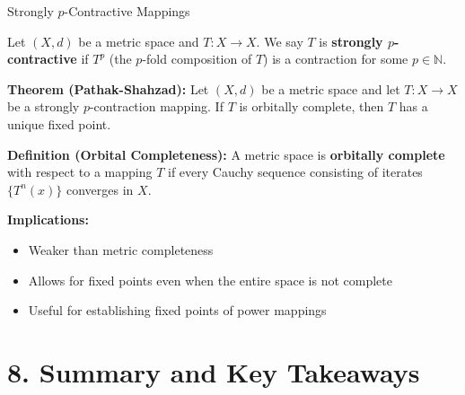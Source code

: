 \documentclass[aspectratio=169,10pt]{beamer}
\begin{document}
\begin{frame}{Strongly $p$-Contractive Mappings}
    \begin{definition}
        Let $(X, d)$ be a metric space and $T: X \to X$. We say $T$ is \textbf{strongly $p$-contractive} if $T^p$ (the $p$-fold composition of $T$) is a contraction for some $p \in \mathbb{N}$.
    \end{definition}

    \vspace{0.3cm}
    \textbf{Theorem (Pathak-Shahzad):} Let $(X, d)$ be a metric space and let $T: X \to X$ be a strongly $p$-contraction mapping. If $T$ is orbitally complete, then $T$ has a unique fixed point.

    \vspace{0.3cm}
    \textbf{Definition (Orbital Completeness):} A metric space is \textbf{orbitally complete} with respect to a mapping $T$ if every Cauchy sequence consisting of iterates $\{T^n(x)\}$ converges in $X$.

    \vspace{0.3cm}
    \textbf{Implications:}
    \begin{itemize}
        \item Weaker than metric completeness
        \item Allows for fixed points even when the entire space is not complete
        \item Useful for establishing fixed points of power mappings
    \end{itemize}
\end{frame}

\section{8. Summary and Key Takeaways}
\end{document}
